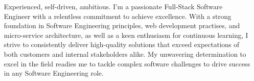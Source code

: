 
\begin{cvparagraph}
    Experienced, self-driven, ambitious. I'm a passionate Full-Stack Software Engineer with a relentless
    commitment to achieve excellence. With a strong foundation in Software Engineering principles, web
    development practises, and micro-service architecture, as well as a keen enthusiasm for continuous learning,
    I strive to consistently deliver high-quality solutions that exceed expectations of both customers and internal
    stakeholders alike. My unwavering determination to excel in the field readies me to tackle complex software
    challenges to drive success in any Software Engineering role.
\end{cvparagraph}
